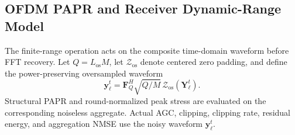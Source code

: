 \documentclass[journal]{IEEEtran}
\newenvironment{revisionblock}{\begingroup\color{revisionred}}{\endgroup}
\begin{document}
\begin{revisionblock}
\subsection{OFDM PAPR and Receiver Dynamic-Range Model}
The finite-range operation acts on the composite time-domain waveform before FFT recovery. Let $Q=L_{\mathrm{os}}M$, let $\mathcal Z_{\mathrm{os}}$ denote centered zero padding, and define the power-preserving oversampled waveform
\begin{equation}
 \mathbf y_\ell^t=\mathbf F_Q^H\sqrt{Q/M}\,\mathcal Z_{\mathrm{os}}(\mathbf Y_\ell^t).
 \label{eqn:oversampling_map}
\end{equation}
Structural PAPR and round-normalized peak stress are evaluated on the corresponding noiseless aggregate. Actual AGC, clipping, clipping rate, residual energy, and aggregation NMSE use the noisy waveform $\mathbf y_\ell^t$.


\end{revisionblock}
\end{document}
